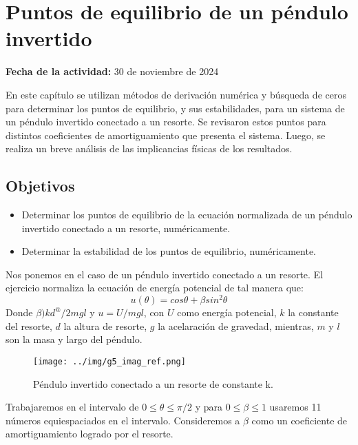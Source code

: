 \documentclass[../portafolio.tex]{subfiles}
\begin{document}
\chapter{Puntos de equilibrio de un péndulo invertido}
\label{g5_ej8}
\hfill \textbf{Fecha de la actividad:} 30 de noviembre de 2024

\medskip

En este capítulo se utilizan métodos de derivación numérica y búsqueda de ceros para determinar los puntos de equilibrio, y sus estabilidades, para un sistema de un péndulo invertido conectado a un resorte. Se revisaron estos puntos para distintos coeficientes de amortiguamiento que presenta el sistema. Luego, se realiza un breve análisis de las implicancias físicas de los resultados.

\section*{Objetivos}
\begin{itemize}
\item Determinar los puntos de equilibrio de la ecuación normalizada de un péndulo invertido conectado a un resorte, numéricamente.
\item Determinar la estabilidad de los puntos de equilibrio, numéricamente.
\end{itemize}
\medskip
Nos ponemos en el caso de un péndulo invertido conectado a un resorte. El ejercicio normaliza la ecuación de energía potencial de tal manera que:
\begin{equation}\label{g5_ej8:eq_dif}
u(\theta)=cos \theta + \beta sin^2\theta
\end{equation}
Donde $\beta)kd^@/2mgl$ y $u=U/mgl$, con $U$ como energía potencial, $k$ la constante del resorte, $d$ la altura de resorte, $g$ la acelaración de gravedad, mientras, $m$ y $l$ son la masa y largo del péndulo.
\begin{figure}
\centering
\texttt{[image: ../img/g5\_imag\_ref.png]}
\caption{Péndulo invertido conectado a un resorte de constante k.} \label{g5_ej8_graf_ref}
\end{figure}
Trabajaremos en el intervalo de $0\leq \theta \leq \pi /2$ y para $0\leq \beta \leq 1$ usaremos 11 números equiespaciados en el intervalo. Consideremos a $\beta$ como un coeficiente de amortiguamiento logrado por el resorte.
\end{document}
